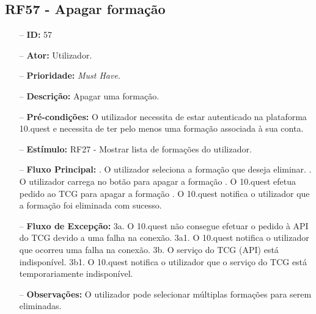 \subsection{RF57 - Apagar formação}
\begin{itemize}
	\item[--] \textbf{ID:} 57
	\item[--]  \textbf{Ator:} Utilizador.
	\item[--]  \textbf{Prioridade:} \textit{Must Have}.
	\item[--]  \textbf{Descrição:} Apagar uma formação.
	\item[--]  \textbf{Pré-condições:} O utilizador necessita de estar autenticado na plataforma 10.quest e necessita de ter pelo menos uma formação associada à sua conta.
	\item[--]  \textbf{Estímulo:} RF27 - Mostrar lista de formações do utilizador.
	\item[--]  \textbf{Fluxo Principal:} 
	. O utilizador seleciona a formação que deseja eliminar.
	. O utilizador carrega no botão para apagar a formação
	. O 10.quest efetua pedido ao TCG para apagar a formação
	. O 10.quest notifica o utilizador que a formação foi eliminada com sucesso.
	\item[--]  \textbf{Fluxo de Excepção:} 
	\subitem 3a. O 10.quest não consegue efetuar o pedido à API do TCG devido a uma falha na conexão.
	\subitem 3a1. O 10.quest notifica o utilizador que ocorreu uma falha na conexão.
	\subitem 3b. O serviço do TCG (API) está indisponível.
	\subitem 3b1. O 10.quest notifica o utilizador que o serviço do TCG está temporariamente indisponível. 
	\item[--]  \textbf{Observações:} O utilizador pode selecionar múltiplas formações para serem eliminadas.
\end{itemize}
\newpage